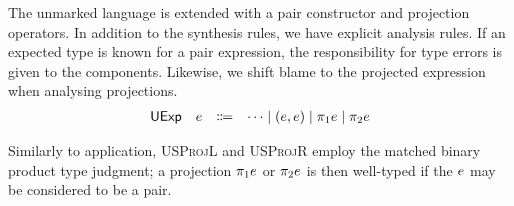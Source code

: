 The unmarked language is extended with a pair constructor and projection operators. In addition to
the synthesis rules, we have explicit analysis rules. If an expected type is known for a pair
expression, the responsibility for type errors is given to the components. Likewise, we shift blame
to the projected expression when analysing projections.
%
\[\begin{array}{rrcl}
  \EMName  & \EMV  & \Coloneqq & \cdots
                               \mid \EPair{\EMV}{\EMV}
                               \mid \EProjL{\EMV} \mid \EProjR{\EMV}
\end{array}\]
%
\begin{mathpar}



\end{mathpar}
%
Similarly to application, \textsc{USProjL} and \textsc{USProjR} employ the matched binary product
type judgment; a projection $\EProjL{\EMV}$ or $\EProjR{\EMV}$ is then well-typed if the $\EMV$ may
be considered to be a pair.

